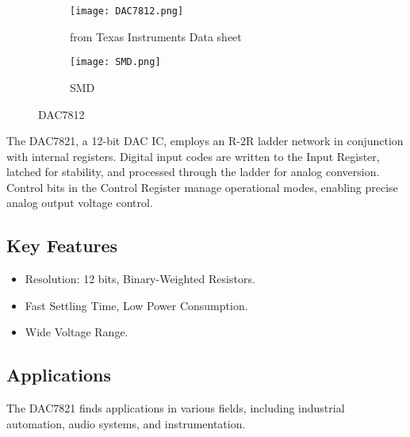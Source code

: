 \documentclass{article}
\begin{document}
\begin{figure}[h]
    \centering
    \begin{subfigure}{0.35\linewidth}
        \centering
        \texttt{[image: DAC7812.png]}
        \caption{from Texas Instruments Data sheet }
        \label{fig:dac7812}
    \end{subfigure}\hspace{0.04\linewidth}
    \begin{subfigure}{0.35\linewidth}
        \centering
        \texttt{[image: SMD.png]}
        \caption{SMD}
        \label{fig:smd}
    \end{subfigure}
    \caption{DAC7812}
    \label{fig:combined}
\end{figure}

The DAC7821, a 12-bit DAC IC, employs an R-2R ladder network in conjunction with internal registers. Digital input codes are written to the Input Register, latched for stability, and processed through the ladder for analog conversion. Control bits in the Control Register manage operational modes, enabling precise analog output voltage control.
\subsection{Key Features}

\begin{itemize}
    \item Resolution: 12 bits, Binary-Weighted Resistors.
    \item Fast Settling Time, Low Power Consumption.
    \item Wide Voltage Range.
\end{itemize}
\subsection{Applications}

The DAC7821 finds applications in various fields, including industrial automation, audio systems, and instrumentation.
\end{document}
